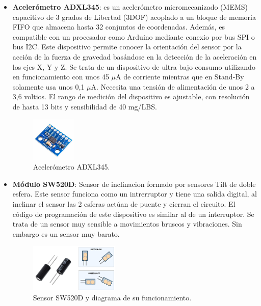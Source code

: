 \begin{itemize}
    \item \textbf{Acelerómetro ADXL345}: es un acelerómetro micromecanizado (MEMS) capacitivo de 3 grados de Libertad (3DOF) acoplado a un bloque de memoria FIFO que almacena hasta 32 conjuntos de coordenadas. Además, es compatible con un procesador como Arduino mediante conexio por bus SPI o bus I2C. Este dispositivo permite conocer la orientación del sensor por la acción de la fuerza de gravedad basándose en la detección de la aceleración en los ejes X, Y y Z. Se trata de un dispositivo de ultra bajo consumo utilizando en funcionamiento con unos 45 $\mu$A de corriente mientras que en Stand-By solamente usa unos 0,1 $\mu$A. Necesita una tensión de alimentación de unos 2 a 3,6 voltios. El rango de medición del dispositivo es ajustable, con resolución de hasta 13 bits y sensibilidad de 40 mg/LBS.
\begin{figure}[h!]
    \centering
    \includegraphics[width=0.2\textwidth]{img/ADXL345.jpeg}
    \caption{Acelerómetro ADXL345\cite{imgADXL345}.}
    \label{fig:ADXL345} %
\end{figure}

    \item \textbf{Módulo SW520D}\cite{SW520D_1}: Sensor de inclinacion formado por sensores Tilt de doble esfera. Este sensor funciona como un intrerruptor y tiene una salida digital, al inclinar el sensor las 2 esferas actúan de puente y cierran el circuito. El código de programación de este dispositivo es similar al de un interruptor. Se trata de un sensor muy sensible a movimientos bruscos y vibraciones. Sin embargo es un sensor muy barato.
\begin{figure}[h!]
    \centering
    \includegraphics[width=0.4\textwidth]{img/imgSW520D_diag.png}
    \caption{Sensor SW520D\cite{imgSW520D} y diagrama de su funcionamiento.}
    \label{fig:imgSW520D} %
\end{figure}


\end{itemize}
